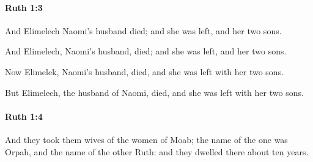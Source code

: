 		\paragraph{Ruth 1:3} %
			\label{RUTH-1-3}

			And Elimelech Naomi’s husband died; and she was left, and her two sons.

			\begin{versebox}
					\item[BHS] 
					\item[LXX] 
					\item[ASV] And Elimelech, Naomi's husband, died; and she was left, and her two sons.
					\item[NIV] Now Elimelek, Naomi’s husband, died, and she was left with her two sons.
					\item[NRSV] But Elimelech, the husband of Naomi, died, and she was left with her two sons.
			\end{versebox}

		\paragraph{Ruth 1:4} %
			\label{RUTH-1-4}

			And they took them wives of the women of Moab; the name of the one was Orpah, and the name of the other Ruth: and they dwelled there about ten years.

